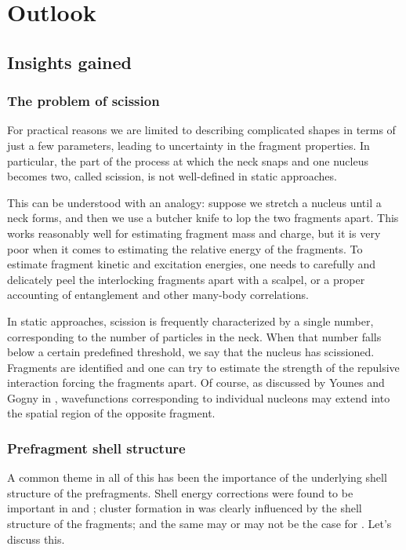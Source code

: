 \chapter{Outlook}\label{chap:Outlook}

\section{Insights gained}
\subsection{The problem of scission}
For practical reasons we are limited to describing complicated shapes in terms of just a few parameters, leading to uncertainty in the fragment properties. In particular, the part of the process at which the neck snaps and one nucleus becomes two, called scission, is not well-defined in static approaches.

This can be understood with an analogy: suppose we stretch a nucleus until a neck forms, and then we use a butcher knife to lop the two fragments apart. This works reasonably well for estimating fragment mass and charge, but it is very poor when it comes to estimating the relative energy of the fragments. To estimate fragment kinetic and excitation energies, one needs to carefully and delicately peel the interlocking fragments apart with a scalpel, or a proper accounting of entanglement and other many-body correlations.

In static approaches, scission is frequently characterized by a single number, corresponding to the number of particles in the neck. When that number falls below a certain predefined threshold, we say that the nucleus has scissioned. Fragments are identified and one can try to estimate the strength of the repulsive interaction forcing the fragments apart. Of course, as discussed by Younes and Gogny in \cite{Bonneau2007,Younes2011}, wavefunctions corresponding to individual nucleons may extend into the spatial region of the opposite fragment.

\subsection{Prefragment shell structure}
A common theme in all of this has been the importance of the underlying shell structure of the prefragments. Shell energy corrections were found to be important in {\Pt} and {\Hg}; cluster formation in {\Og} was clearly influenced by the shell structure of the fragments; and the same may or may not be the case for {\Cf}. Let's discuss this.

